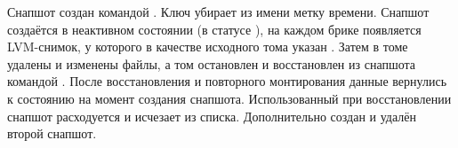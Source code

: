 Снапшот создан командой . Ключ  убирает из имени метку времени. Снапшот создаётся в неактивном состоянии (в статусе ), на каждом брике появляется LVM-снимок, у которого в качестве исходного тома указан . Затем в томе удалены и изменены файлы, а том остановлен и восстановлен из снапшота командой . После восстановления и повторного монтирования данные вернулись к состоянию на момент создания снапшота. Использованный при восстановлении снапшот расходуется и исчезает из списка. Дополнительно создан и удалён второй снапшот.
